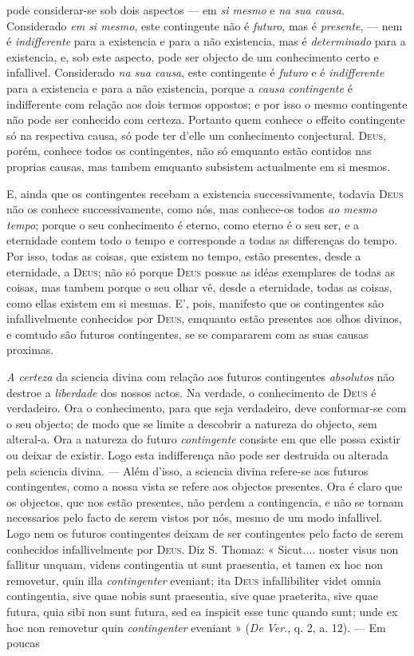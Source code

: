 pode considerar-se sob dois aspectos --- em \emph{si mesmo} e \emph{na sua causa}. Considerado \emph{em si mesmo}, este contingente não é \emph{futuro}, mas é \emph{presente}, --- nem é \emph{indifferente} para a existencia e para a não existencia, mas é \emph{determinado} para a existencia, e, sob este aspecto, pode ser objecto de um conhecimento certo e infallivel. Considerado \emph{na sua causa}, este contingente é \emph{futuro} e é \emph{indifferente} para a existencia e para a não existencia, porque a \emph{causa contingente} é indifferente com relação aos dois termos oppostos; e por isso o mesmo contingente não pode ser conhecido com certeza. Portanto quem conhece o effeito contingente só na respectiva causa, só pode ter d'elle um conhecimento conjectural. \textsc{Deus}, porém, conhece todos os contingentes, não só emquanto estão contidos nas proprias causas, mas tambem emquanto subsistem actualmente em si mesmos.\par {}E, ainda que os contingentes recebam a existencia successivamente, todavia \textsc{Deus} não os conhece successivamente, como nós, mas conhece-os todos \emph{ao mesmo tempo}; porque o seu conhecimento é eterno, como eterno é o seu ser, e a eternidade contem todo o tempo e corresponde a todas as differenças do tempo. Por isso, todas as coisas, que existem no tempo, estão presentes, desde a eternidade, a \textsc{Deus}; não só porque \textsc{Deus} possue as idéas exemplares de todas as coisas, mas tambem porque o seu olhar vê, desde a eternidade, todas as coisas, como ellas existem em si mesmas. E', pois, manifesto que os contingentes são infallivelmente conhecidos por \textsc{Deus}, emquanto estão presentes aos olhos divinos, e comtudo são futuros contingentes, se se compararem com as suas causas proximas.\par \emph{A certeza} da sciencia divina com relação aos futuros contingentes \emph{absolutos} não destroe a \emph{liberdade} dos nossos actos. Na verdade, o conhecimento de \textsc{Deus} é verdadeiro. Ora o conhecimento, para que seja verdadeiro, deve conformar-se com o seu objecto; de modo que se limite a descobrir a natureza do objecto, sem alteral-a. Ora a natureza do futuro \emph{contingente} consiste em que elle possa existir ou deixar de existir. Logo esta indifferença não pode ser destruida ou alterada pela sciencia divina. --- Além d'isso, a sciencia divina refere-se aos futuros contingentes, como a nossa vista se refere aos objectos presentes. Ora é claro que os objectos, que nos estão presentes, não perdem a contingencia, e não se tornam necessarios pelo facto de serem vistos por nós, mesmo de um modo infallivel. Logo nem os futuros contingentes deixam de ser contingentes pelo facto de serem conhecidos infallivelmente por \textsc{Deus}. Diz S. Thomaz: « Sicut.... noster visus non fallitur unquam, videns contingentia ut sunt praesentia, et tamen ex hoc non removetur, quin illa \emph{contingenter} eveniant; ita \textsc{Deus} infallibiliter videt omnia contingentia, sive quae nobis sunt praesentia, sive quae praeterita, sive quae futura, quia sibi non sunt futura, sed ea inspicit esse tunc quando sunt; unde ex hoc non removetur quin \emph{contingenter} eveniant » (\emph{De} \emph{Ver}., q. 2, a. 12). --- Em poucas 